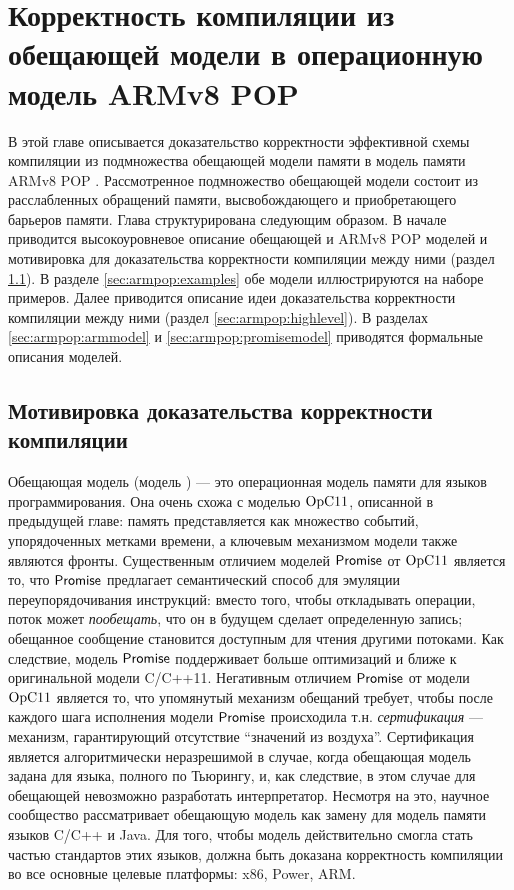 \chapter{Корректность компиляции из обещающей модели в операционную модель ARMv8 POP} \label{sec:armpop}

В этой главе описывается доказательство корректности эффективной схемы компиляции из
подмножества обещающей модели памяти \cite{Kang-al:POPL17} в модель памяти ARMv8 POP \cite{Flur-al:POPL16}.
Рассмотренное подмножество обещающей модели состоит из расслабленных обращений памяти,
высвобождающего и приобретающего барьеров памяти.
Глава структурирована следующим образом.
В начале приводится высокоуровневое описание обещающей и ARMv8 POP моделей и мотивировка для доказательства
корректности компиляции между ними (раздел \ref{sec:armpop:motive}).
В разделе \ref{sec:armpop:examples} обе модели иллюстрируются на наборе примеров.
Далее приводится описание идеи доказательства корректности компиляции между ними (раздел \ref{sec:armpop:highlevel}).
В разделах \ref{sec:armpop:armmodel}  и \ref{sec:armpop:promisemodel} приводятся формальные описания моделей.

\section{Мотивировка доказательства корректности компиляции}
\label{sec:armpop:motive}
Обещающая модель (модель \Promise) --- это операционная модель памяти для языков программирования.
Она очень схожа с моделью $\mathrm{OpC11}$, описанной в предыдущей главе: память представляется как множество событий,
упорядоченных метками времени, а ключевым механизмом модели также являются фронты.
Существенным отличием моделей $\mathsf{Promise}$ от $\mathrm{OpC11}$ является то, что $\mathsf{Promise}$ предлагает семантический
способ для эмуляции переупорядочивания инструкций:
вместо того, чтобы откладывать операции, поток может \emph{пообещать}, что он в будущем сделает определенную запись;
обещанное сообщение становится доступным для чтения другими потоками.
Как следствие, модель $\mathsf{Promise}$ поддерживает больше оптимизаций и ближе к оригинальной модели C/C++11.
Негативным отличием $\mathsf{Promise}$ от модели $\mathrm{OpC11}$ является то, что упомянутый механизм обещаний требует, чтобы
после каждого шага исполнения модели $\mathsf{Promise}$ происходила т.н. \emph{сертификация} --- механизм, гарантирующий
отсутствие ``значений из воздуха''. Сертификация является алгоритмически неразрешимой в случае, когда обещающая
модель задана для языка, полного по Тьюрингу, и, как следствие, в этом случае для обещающей невозможно
разработать интерпретатор.
Несмотря на это, научное сообщество рассматривает обещающую модель как замену для модель памяти языков C/C++ и Java.
Для того, чтобы модель действительно смогла стать частью стандартов этих языков, должна быть доказана корректность
компиляции во все основные целевые платформы: x86, Power, ARM.

